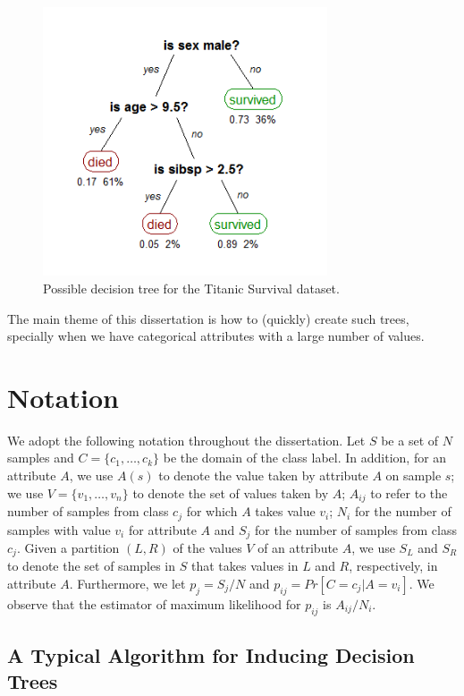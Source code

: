 \begin{figure}[h]
\centering
\includegraphics[width=0.75\textwidth]{titanic-tree}
\caption{Possible decision tree for the Titanic Survival dataset.}
\label{fig:titanic-tree}
\end{figure}

The main theme of this dissertation is how to (quickly) create such trees, specially when we have categorical attributes with a large number of values.

\section{Notation}
\label{sec:notation}
We adopt the following notation throughout the dissertation.
Let $S$ be a set of $N$ samples and 
 $C=\{c_1,\ldots,c_k\}$ be the domain of the class label. 
In addition, for an attribute  $A$, we use $A(s)$ to denote the value taken by attribute
$A$ on sample $s$; we use 
  $V=\{ v_1,\ldots,v_n \}$ to denote the set of values
taken by $A$;
$A_{ij}$ to refer to the  number of samples
from class $c_j$ for which  $A$ takes value $v_i$; 
 $N_i$ for the number of samples with value $v_i$ for attribute $A$
and $S_j$ for the number of samples from class $c_j$.
Given a partition $(L, R)$ of the values $V$ of an attribute $A$, we use $S_L$ and $S_R$
to denote the set of samples in $S$ that takes values in $L$ and $R$, respectively, in attribute $A$.
Furthermore, we let $p_j = S_j /N$ and $p_{ij}= Pr[C=c_j | A = v_i]$.
We observe that the estimator of maximum likelihood for $p_{ij} $ is
$A_{ij} / N_i$.


\subsection{A Typical Algorithm for Inducing Decision Trees}

